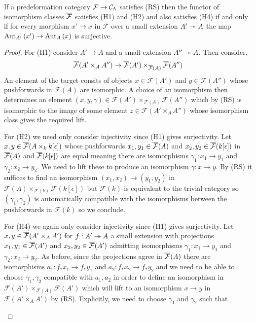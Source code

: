 \documentclass[12pt]{article}
\renewcommand{\F}{\mathcal{F}}
\begin{document}
\begin{prop} \label{prop:RS_to_H}
If a predeformation category $\F \to \C_\Lambda$ satisfies (RS) then the functor of isomorphism classes $\ol{\F}$ satisfies (H1) and (H2) and also satisfies (H4) if and only if for every morphism $x' \to x$ in $\F$ over a small extension $A' \onto A$ the map $\Aut[A']{x'} \to \Aut[A]{x}$ is surjective.
\end{prop}

\begin{proof}
For (H1) consider $A' \to A$ and a small extension $A'' \onto A$. Then consider,
\[ \ol{\F}(A' \times_A A'') \to \ol{\F}(A') \times_{\ol{\F}(A)} \ol{\F}(A'') \]
An element of the target consits of objects $x \in \F(A')$ and $y \in \F(A'')$ whose pushforwards in $\F(A)$ are isomorphic. A choice of an isomorphism then determines an element $(x, y, \gamma) \in \F(A') \times_{\F(A)} \F(A'')$ which by (RS) is isomorphic to the image of some element $z \in \F(A' \times_A A'')$ whose isomorphism class gives the required lift. 
\par 
For (H2) we need only consider injectivity since (H1) gives surjectivity. Let $x,y \in \ol{\F}(A \times_k k[\epsilon])$ whose pushforwards $x_1, y_1 \in \ol{\F}(A)$ and $x_2, y_2 \in \ol{\F}(k[\epsilon])$ in $\ol{\F}(A)$ and $\ol{\F}(k[\epsilon])$ are equal meaning there are isomorphisms $\gamma_1 : x_1 \to y_1$ and $\gamma_2 : x_2 \to y_2$. We need to lift these to produce an isomorphism $\gamma : x \to y$. By (RS) it suffices to find an isomorphism $(x_1, x_2) \to (y_1, y_2)$ in $\F(A) \times_{\F(k)} \F(k[\epsilon])$ but $\F(k)$ is equivalent to the trivial category so $(\gamma_1, \gamma_2)$ is automatically compatible with the isomorphisms between the pushforwards in $\F(k)$ so we conclude. 
\par
For (H4) we again only consider injectivity since (H1) gives surjectivity. Let $x, y \in \ol{\F}(A' \times_A A')$ for $f : A' \onto A$ a small extension with projections $x_1, y_1 \in \ol{\F}(A')$ and $x_2, y_2 \in \ol{\F}(A')$ admitting isomorphisms $\gamma_1 : x_1 \to y_1$ and $\gamma_2 : x_2 \to y_2$. As before, since the projections agree in $\ol{\F}(A)$ there are isomorphisms $a_1 : f_* x_1 \to f_* y_1$ and $a_2 : f_* x_2 \to f_* y_2$ and we need to be able to choose $\gamma_1, \gamma_2$ compatible with $a_1, a_2$ in order to define an isomorphism in $\F(A') \times_{\F(A)} \F(A')$ which will lift to an isomorphism $x \to y$ in $\F(A' \times_A A')$ by (RS). Explicitly, we need to choose $\gamma_1$ and $\gamma_2$ such that 
\begin{center}

\end{center}
\end{proof}
\end{document}
